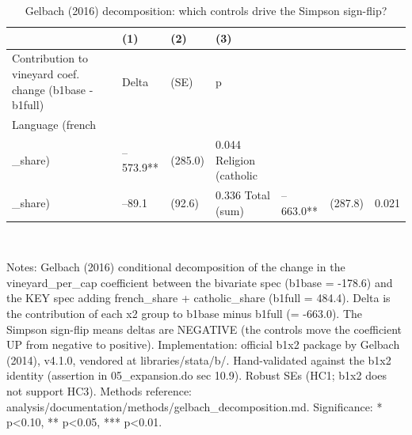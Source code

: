 \documentclass{article}
\begin{document}
\begin{table}[tbp] \centering
{}

\caption{Gelbach (2016) decomposition: which controls drive the Simpson sign-flip?}
\label{tab:gelbach}
\begin{tabularx}{\linewidth}{@{}lCCC@{}}

\toprule
&{(1)}&{(2)}&{(3)} \tabularnewline \midrule
{Contribution to vineyard coef. change (b1base - b1full)}&{Delta}&{(SE)}&{p} \tabularnewline
\midrule \addlinespace[\belowrulesep]
Language (french\\_share)&--573.9**&(285.0)&0.044
Religion (catholic\\_share)&--89.1&(92.6)&0.336
Total (sum)&--663.0**&(287.8)&0.021
\bottomrule \addlinespace[\belowrulesep]

\end{tabularx}
\\ \parbox{\linewidth}{\footnotesize Notes: Gelbach (2016) conditional decomposition of the change in the vineyard\_per\_cap coefficient between the bivariate spec (b1base = -178.6) and the KEY spec adding french\_share + catholic\_share (b1full =  484.4). Delta is the contribution of each x2 group to b1base minus b1full (= -663.0). The Simpson sign-flip means deltas are NEGATIVE (the controls move the coefficient UP from negative to positive). Implementation: official b1x2 package by Gelbach (2014), v4.1.0, vendored at libraries/stata/b/. Hand-validated against the b1x2 identity (assertion in 05\_expansion.do sec 10.9). Robust SEs (HC1; b1x2 does not support HC3). Methods reference: analysis/documentation/methods/gelbach\_decomposition.md. Significance: * p<0.10, ** p<0.05, *** p<0.01.}
\end{table}
\end{document}
